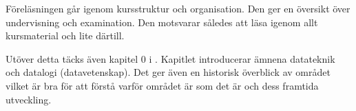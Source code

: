 Föreläsningen går igenom kursstruktur och organisation.
Den ger en översikt över undervisning och examination.
Den motsvarar således att läsa igenom allt kursmaterial och lite därtill.

Utöver detta täcks även kapitel 0 i  
\cite{Brookshear2012csa}.
Kapitlet introducerar ämnena datateknik och datalogi (datavetenskap).
Det ger även en historisk överblick av området vilket är bra för att förstå 
varför området är som det är och dess framtida utveckling.
